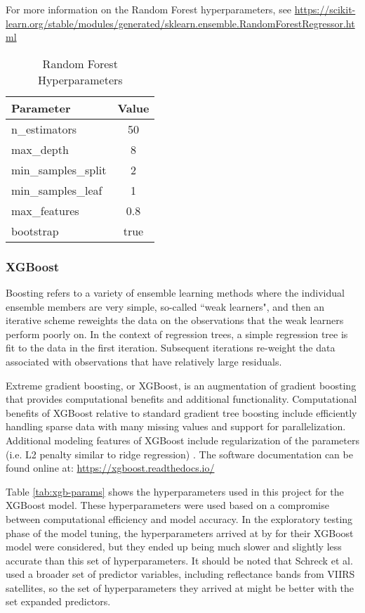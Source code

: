 For more information on the Random Forest hyperparameters, see \url{https://scikit-learn.org/stable/modules/generated/sklearn.ensemble.RandomForestRegressor.html}

\begin{table}[ht]
\centering
\begin{tabular}{|l|c|}
\hline
\textbf{Parameter} & \textbf{Value} \\
\hline
n\_estimators & 50 \\
max\_depth & 8 \\
min\_samples\_split & 2 \\
min\_samples\_leaf & 1 \\
max\_features & 0.8 \\
bootstrap & true \\
\hline
\end{tabular}
\caption{Random Forest Hyperparameters}
\label{tab:rf-params}
\end{table}


\subsubsection{XGBoost}
\hfill

Boosting refers to a variety of ensemble learning methods where the individual ensemble members are very simple, so-called ``weak learners", and then an iterative scheme reweights the data on the observations that the weak learners perform poorly on. In the context of regression trees, a simple regression tree is fit to the data in the first iteration. Subsequent iterations re-weight the data associated with observations that have relatively large residuals. 

Extreme gradient boosting, or XGBoost, is an augmentation of gradient boosting that provides computational benefits and additional functionality. Computational benefits of XGBoost relative to standard gradient tree boosting include efficiently handling sparse data with many missing values and support for parallelization. Additional modeling features of XGBoost include regularization of the parameters (i.e. L2 penalty similar to ridge regression) \citep[p.\ 337]{Hastie-2010-ESL}. The software documentation can be found online at: \url{https://xgboost.readthedocs.io/}

Table \ref{tab:xgb-params} shows the hyperparameters used in this project for the XGBoost model. These hyperparameters were used based on a compromise between computational efficiency and model accuracy. In the exploratory testing phase of the model tuning, the hyperparameters arrived at by \cite{Schreck-2023-MLV} for their XGBoost model were considered, but they ended up being much slower and slightly less accurate than this set of hyperparameters. It should be noted that Schreck et al. used a broader set of predictor variables, including reflectance bands from VIIRS satellites, so the set of hyperparameters they arrived at might be better with the set expanded predictors. 

